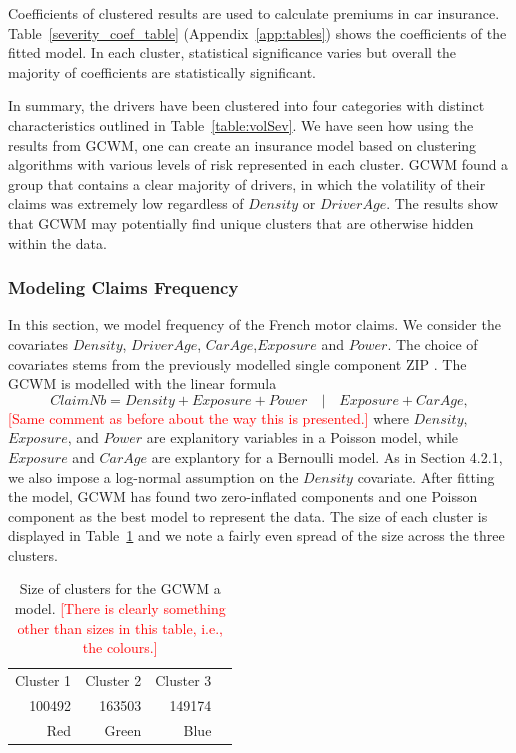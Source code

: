 \documentclass[11pt,letterpaper]{article}
\numberwithin{equation}{section}
\numberwithin{equation}{section}
\numberwithin{equation}{section}
\begin{document}
Coefficients of clustered results are used to calculate premiums in car insurance. Table~\ref{severity_coef_table} (Appendix~\ref{app:tables}) shows the coefficients of the fitted model. In each cluster, statistical significance varies but overall the majority of coefficients are statistically significant.

In summary, the drivers have been clustered into four categories with distinct characteristics outlined in Table~\ref{table:volSev}. We have seen how using the results from GCWM, one can create an insurance model based on clustering algorithms with various levels of risk represented in each cluster. GCWM found a group that contains a clear majority of drivers, in which the volatility of their claims was extremely low regardless of $Density$ or $DriverAge$. The results show that GCWM may potentially find unique clusters that are otherwise hidden within the data.


 \subsubsection{Modeling Claims Frequency}

In this section, we model frequency of the French motor claims. We consider the covariates $Density$, $DriverAge$, $CarAge$,$Exposure$ and $Power$. The choice of covariates stems from the previously modelled single component ZIP \citep{Charpentier:2014}.
The GCWM is modelled with the linear formula
\begin{equation}
Claim Nb = Density + Exposure + Power \quad|\quad Exposure + Car Age,
\end{equation}
\textcolor{red}{[Same comment as before about the way this is presented.]}
where $Density$, $Exposure$, and $Power$ are explanitory variables in a Poisson model, while $Exposure$ and $Car Age$ are explantory for a Bernoulli model. As in Section 4.2.1, we also impose a log-normal assumption on the $Density$ covariate.
After fitting the model, GCWM has found two zero-inflated components and one Poisson component as the best model to represent the data. The size of each cluster is displayed in Table~\ref{table:sizeFreq} and we note a fairly even spread of the size across the three clusters.
\begin{table}[!htb]
\centering
\caption{Size of clusters for the GCWM a model. \textcolor{red}{[There is clearly something other than sizes in this table, i.e., the colours.]}}
\label{table:sizeFreq}
\begin{tabular}{rrrr}
\hline
Cluster 1   & Cluster 2  & Cluster 3   \\
100492 & 163503 & 149174 \\
Red & Green & Blue  \\
\hline
\end{tabular}
\end{table}
\end{document}
